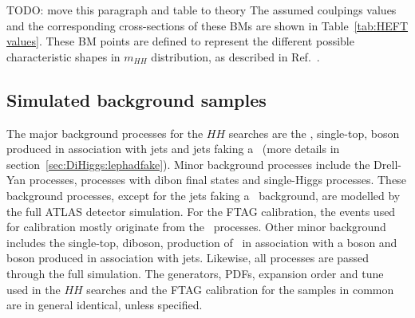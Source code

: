 TODO: move this paragraph and table to theory
The assumed coulpings values and the corresponding cross-sections
of these BMs are shown in Table~\ref{tab:HEFT values}.
These BM points are defined to represent the different possible characteristic shapes
in $m_{HH}$ distribution, as described in Ref.~\cite{HEFT-BM}.
\begin{table}[tb!]
    \begin{center}{\large    
    }
    \end{center}
    \caption
    {The proposed coupling values and the corresponding cross-sections of each BMs. 
    The physical meaning of each coupling is described in section~\ref{sec:Theory} TODO: add reference to theory section.
    \label{tab:HEFT values}}
    \end{table}
    


\subsection{Simulated background samples}
\label{sec:MC samples}
The major background processes for the 
$HH$ searches are the \ttbar, single-top, 
boson produced in association with jets and jets faking a 
\tauhad\ (more details in section~\ref{sec:DiHiggs:lephadfake}). 
Minor background processes include the Drell-Yan processes, 
processes with dibon final states and single-Higgs processes.
These background processes, except for the jets faking a 
\tauhad\ background, are modelled by the full ATLAS 
detector simulation. 
For the FTAG calibration, the events used for calibration
mostly originate from the \ttbar\ processes. Other minor 
background includes the single-top, diboson,  
production of \ttbar\ in association with a boson 
and boson produced in association with jets. 
Likewise, all processes are passed through the 
full simulation. The generators, PDFs,
expansion order and tune used in the $HH$ searches
and the FTAG calibration for the samples in common 
are in general identical, unless specified. 

